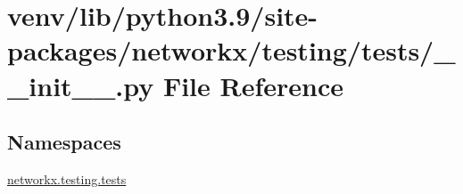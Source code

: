 \hypertarget{venv_2lib_2python3_89_2site-packages_2networkx_2testing_2tests_2____init_____8py}{}\section{venv/lib/python3.9/site-\/packages/networkx/testing/tests/\+\_\+\+\_\+init\+\_\+\+\_\+.py File Reference}
\label{venv_2lib_2python3_89_2site-packages_2networkx_2testing_2tests_2____init_____8py}
\subsection*{Namespaces}
\begin{DoxyCompactItemize}
\item 
 \hyperlink{namespacenetworkx_1_1testing_1_1tests}{networkx.\+testing.\+tests}
\end{DoxyCompactItemize}
